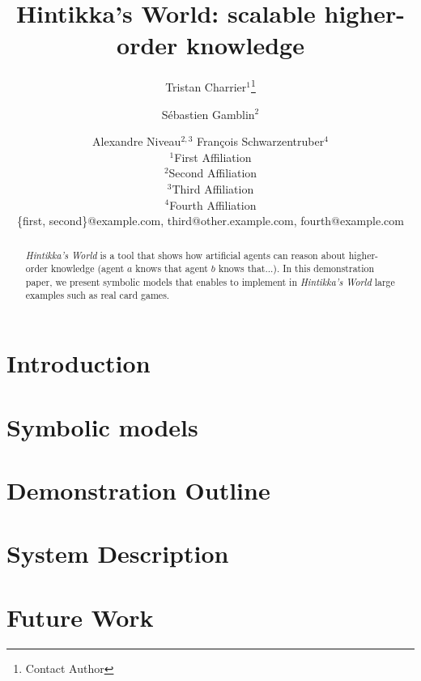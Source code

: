 \documentclass{article}
\title{Hintikka's World: scalable higher-order knowledge}
\author{
Tristan Charrier$^1$\footnote{Contact Author}\and
Sébastien Gamblin$^2$\and
Alexandre Niveau$^{2,3}$\And
François Schwarzentruber$^4$\\
\affiliations
$^1$First Affiliation\\
$^2$Second Affiliation\\
$^3$Third Affiliation\\
$^4$Fourth Affiliation\\
\emails
\{first, second\}@example.com,
third@other.example.com,
fourth@example.com
}
\begin{document}
\newcommand{\mettel}{\textsf{MetTeL2}\xspace}

\maketitle

\begin{abstract}
	\emph{Hintikka's World} is a tool that shows how artificial agents can reason about higher-order knowledge (agent $a$ knows that agent $b$ knows that...).
	In this demonstration paper, we present symbolic models  that enables to implement in  \emph{Hintikka's World} large examples such as real card games. 
\end{abstract}



\section{Introduction}


\section{Symbolic models}
\label{section:symbolicmodels}


\section{Demonstration Outline}
\label{section:demonstration}






\section{System Description}
\label{section:architecture}


\section{Future Work}
\label{section:perspectives}











\newpage





\end{document}
